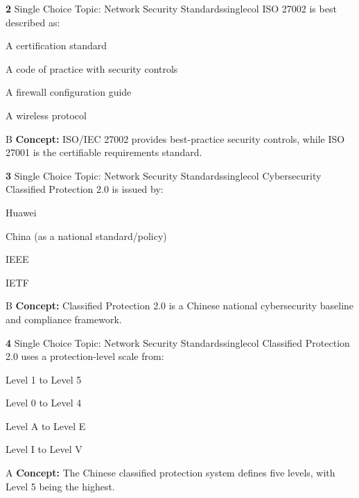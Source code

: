 \documentclass[10pt,a4paper]{article}
\begin{document}
\begin{qcard}{\color{white}\textbf{2} \hfill \small Single Choice \textbar{} Topic: Network Security Standards}{singlecol}
ISO 27002 is best described as:

\begin{qoptions}
\item A certification standard
\item A code of practice with security controls
\item A firewall configuration guide
\item A wireless protocol
\end{qoptions}
\begin{explainbox}{B}
\textbf{Concept:} ISO/IEC 27002 provides best-practice security controls, while ISO 27001 is the certifiable requirements standard.
\end{explainbox}
\end{qcard}

\begin{qcard}{\color{white}\textbf{3} \hfill \small Single Choice \textbar{} Topic: Network Security Standards}{singlecol}
Cybersecurity Classified Protection 2.0 is issued by:

\begin{qoptions}
\item Huawei
\item China (as a national standard/policy)
\item IEEE
\item IETF
\end{qoptions}
\begin{explainbox}{B}
\textbf{Concept:} Classified Protection 2.0 is a Chinese national cybersecurity baseline and compliance framework.
\end{explainbox}
\end{qcard}

\begin{qcard}{\color{white}\textbf{4} \hfill \small Single Choice \textbar{} Topic: Network Security Standards}{singlecol}
Classified Protection 2.0 uses a protection-level scale from:

\begin{qoptions}
\item Level 1 to Level 5
\item Level 0 to Level 4
\item Level A to Level E
\item Level I to Level V
\end{qoptions}
\begin{explainbox}{A}
\textbf{Concept:} The Chinese classified protection system defines five levels, with Level 5 being the highest.
\end{explainbox}
\end{qcard}
\end{document}
